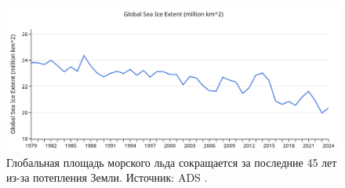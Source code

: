 \documentclass[10pt,twocolumn,letterpaper]{article}
\begin{document}
\begin{figure}[t]
\begin{center}
\includegraphics[width=1\textwidth]{ice.jpg}
\end{center}
   \caption{Глобальная площадь морского льда сокращается за последние 45 лет из-за потепления Земли. Источник: ADS \cite{149}.}
\label{fig:24}
\end{figure}

\clearpage
\twocolumn

{\small
\renewcommand{\refname}{References}


}
\end{document}
